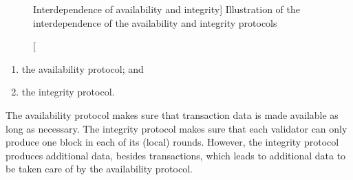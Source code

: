 \documentclass{article}
\theoremstyle{definition}
\newcommand{\Dag}[1][]{\textsc{dag}#1\xspace}
\begin{document}
\begin{figure}[htb]
  \centering
  
  \protect{}
  \caption%
  [Interdependence of availability and integrity]%
  {Illustration of the interdependence of the availability and integrity protocols}
  \label{fig:availability-n-integrity}
\end{figure}
 \begin{enumerate}
 \item the availability protocol; and
 \item the integrity protocol. 
 \end{enumerate}
 The availability protocol makes sure
 that transaction data is made available as long as necessary.
 The integrity protocol makes sure that 
 each validator can only produce one block in each of its (local) rounds. 
 However, %
 the integrity protocol produces additional data, %
 besides transactions, 
 which leads to additional data to be taken care of by the availability protocol.
\end{document}
